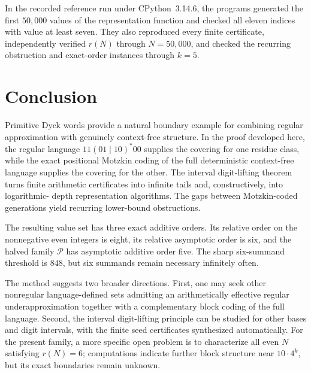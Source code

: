 \documentclass{ws-ijfcs}
\newcommand{\Pset}{\mathcal P}
\begin{document}
In the recorded reference run under CPython~3.14.6, the programs generated
the first $50{,}000$ values of the representation function and checked all
eleven indices with value at least seven.  They also reproduced every
finite certificate, independently verified $r(N)$ through $N=50{,}000$,
and checked the recurring obstruction and exact-order instances through
$k=5$.
\section{Conclusion}\label{sec:conclusion}

Primitive Dyck words provide a natural boundary example for combining
regular approximation with genuinely context-free structure.  In the
proof developed here, the regular language $11(01\mid10)^*00$ supplies the
covering for one residue class, while the exact positional Motzkin coding
of the full deterministic context-free language supplies the covering for
the other.  The interval digit-lifting theorem turns finite arithmetic
certificates into infinite tails and, constructively, into logarithmic-
depth representation algorithms.  The gaps between Motzkin-coded
generations yield recurring lower-bound obstructions.

The resulting value set has three exact additive orders.  Its relative
order on the nonnegative even integers is eight, its relative asymptotic
order is six, and the halved family $\Pset$ has asymptotic additive order
five.  The sharp six-summand threshold is $848$, but six summands remain
necessary infinitely often.

The method suggests two broader directions.  First, one may seek other
nonregular language-defined sets admitting an arithmetically effective
regular underapproximation together with a complementary block coding of
the full language.  Second, the interval digit-lifting principle can be
studied for other bases and digit intervals, with the finite seed
certificates synthesized automatically.  For the present family, a more
specific open problem is to characterize all even $N$ satisfying
$r(N)=6$; computations indicate further block structure near
$10\cdot4^k$, but its exact boundaries remain unknown.
\end{document}
